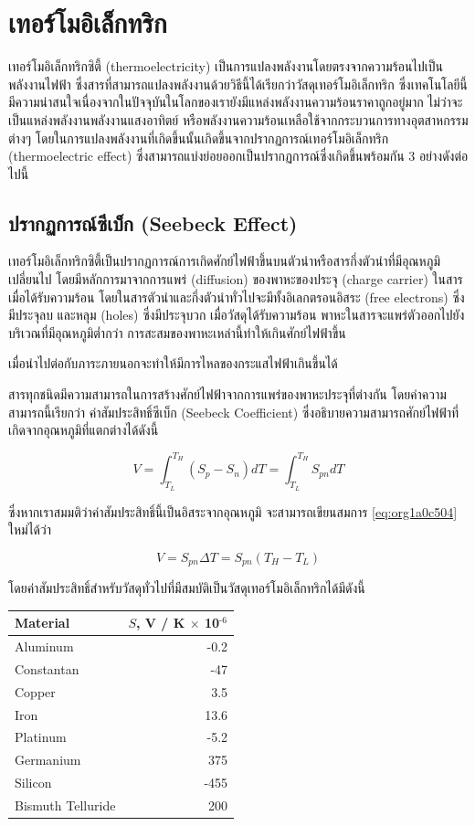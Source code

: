 \documentclass[a4paper,nobib,openany]{tufte-book}
\begin{document}
\chapter{เทอร์โมอิเล็กทริก}
\label{sec:org2f3419f}
เทอร์โมอิเล็กทริกซิตี้ (thermoelectricity) เป็นการแปลงพลังงานโดยตรงจากความร้อนไปเป็นพลังงานไฟฟ้า
ซึ่งสารที่สามารถแปลงพลังงานด้วยวิธีนี้ได้เรียกว่าวัสดุเทอร์โมอิเล็กทริก
ซึ่งเทคโนโลยีนี้มีความน่าสนใจเนื่องจากในปัจจุบันในโลกของเรายังมีแหล่งพลังงานความร้อนราคาถูกอยู่มาก
ไม่ว่าจะเป็นแหล่งพลังงานพลังงานแสงอาทิตย์ หรือพลังงานความร้อนเหลือใช้จากกระบวนการทางอุตสาหกรรมต่างๆ
โดยในการแปลงพลังงานที่เกิดขึ้นนั้นเกิดขึ้นจากปรากฏการณ์เทอร์โมอิเล็กทริก
(thermoelectric effect)
ซึ่งสามารถแบ่งย่อยออกเป็นปรากฏการณ์ซึ่งเกิดขึ้นพร้อมกัน 3
อย่างดังต่อไปนี้

\section{ปรากฏการณ์ซีเบ็ก (Seebeck Effect)}
\label{sec:orgf98062e}
เทอร์โมอิเล็กทริกซิตี้เป็นปรากฏการณ์การเกิดศักย์ไฟฟ้าขึ้นบนตัวนำหรือสารกึ่งตัวนำที่มีอุณหภูมิเปลี่ยนไป
โดยมีหลักการมาจากการแพร่ (diffusion) ของพาหะของประจุ (charge carrier)
ในสารเมื่อได้รับความร้อน
โดยในสารตัวนำและกึ่งตัวนำทั่วไปจะมีทั้งอิเลกตรอนอิสระ (free electrons)
ซึ่งมีประจุลบ และหลุม (holes) ซึ่งมีประจุบวก เมื่อวัสดุได้รับความร้อน
พาหะในสารจะแพร่ตัวออกไปยังบริเวณที่มีอุณหภูมิต่ำกว่า
การสะสมของพาหะเหล่านี้ทำให้เกินศักย์ไฟฟ้าขึ้น

เมื่อนำไปต่อกับภาระภายนอกจะทำให้มีการไหลของกระแสไฟฟ้าเกินขึ้นได้

สารทุกชนิดมีความสามารถในการสร้างศักย์ไฟฟ้าจากการแพร่ของพาหะประจุที่ต่างกัน
โดยค่าความสามารถนี้เรียกว่า ค่าสัมประสิทธิ์ซีเบ็ก (Seebeck Coefficient)
ซึ่งอธิบายความสามารถศักย์ไฟฟ้าที่เกิดจากอุณหภูมิที่แตกต่างได้ดังนี้

\begin{equation}
\label{eq:org1a0c504}
  V = \int_{T_L}^{T_H} \left( S_p - S_n \right) dT = \int_{T_L}^{T_H} S_{pn} dT
\end{equation}

ซึ่งหากเราสมมติว่าค่าสัมประสิทธิ์นี้เป็นอิสระจากอุณหภูมิ จะสามารถเขียนสมการ \ref{eq:org1a0c504} ใหม่ได้ว่า

\[V = S_{pn} \Delta T = S_{pn} \left( T_H - T_L \right)\]

โดยค่าสัมประสิทธิ์สำหรับวัสดุทั่วไปที่มีสมบัติเป็นวัสดุเทอร์โมอิเล็กทริกได้มีดังนี้

\begin{center}
\begin{tabular}{lr}
\toprule
Material & \(S\), V / K \(\times\) 10\(^{\text{-6}}\)\\
\midrule
Aluminum & -0.2\\
Constantan & -47\\
Copper & 3.5\\
Iron & 13.6\\
Platinum & -5.2\\
Germanium & 375\\
Silicon & -455\\
Bismuth Telluride & 200\\
\bottomrule
\end{tabular}
\end{center}
\end{document}
